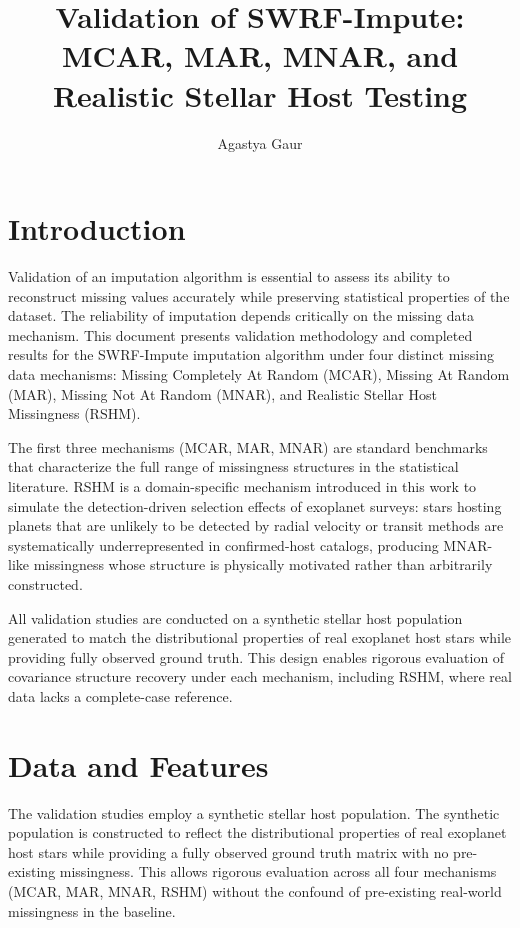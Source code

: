 \documentclass[preprint]{aastex631}
\begin{document}
\title{Validation of SWRF-Impute: MCAR, MAR, MNAR, and Realistic Stellar Host Testing}
\author{Agastya Gaur}
\noaffiliation

\section{Introduction}

Validation of an imputation algorithm is essential to assess its ability to reconstruct missing values accurately while preserving statistical properties of the dataset. The reliability of imputation depends critically on the missing data mechanism. This document presents validation methodology and completed results for the SWRF-Impute imputation algorithm under four distinct missing data mechanisms: Missing Completely At Random (MCAR), Missing At Random (MAR), Missing Not At Random (MNAR), and Realistic Stellar Host Missingness (RSHM).

The first three mechanisms (MCAR, MAR, MNAR) are standard benchmarks that characterize the full range of missingness structures in the statistical literature. RSHM is a domain-specific mechanism introduced in this work to simulate the detection-driven selection effects of exoplanet surveys: stars hosting planets that are unlikely to be detected by radial velocity or transit methods are systematically underrepresented in confirmed-host catalogs, producing MNAR-like missingness whose structure is physically motivated rather than arbitrarily constructed.

All validation studies are conducted on a synthetic stellar host population generated to match the distributional properties of real exoplanet host stars while providing fully observed ground truth. This design enables rigorous evaluation of covariance structure recovery under each mechanism, including RSHM, where real data lacks a complete-case reference.

\section{Data and Features}

The validation studies employ a synthetic stellar host population. The synthetic population is constructed to reflect the distributional properties of real exoplanet host stars while providing a fully observed ground truth matrix with no pre-existing missingness. This allows rigorous evaluation across all four mechanisms (MCAR, MAR, MNAR, RSHM) without the confound of pre-existing real-world missingness in the baseline.
\end{document}
